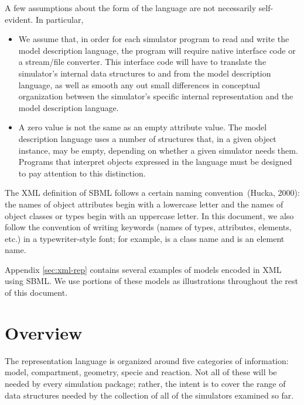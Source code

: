 \documentclass[10pt]{cek-article}
\begin{document}
A few assumptions about the form of the language are not
necessarily self-evident.  In particular,
\begin{itemize}

\item We assume that, in order for each simulator program to read and write
  the model description language, the program will require native interface
  code or a stream/file converter.  This interface code will have to
  translate the simulator's internal data structures to and from the model
  description language, as well as smooth any out small differences in
  conceptual organization between the simulator's specific internal
  representation and the model description language.

\item A zero value is not the same as an empty attribute value.  The model
  description language uses a number of structures that, in a given object
  instance, may be empty, depending on whether a given simulator needs
  them.  Programs that interpret objects expressed in the language must be
  designed to pay attention to this distinction.

\end{itemize}

The XML definition of SBML follows a certain naming convention~(Hucka,
2000): the names of object attributes begin with a lowercase letter and the
names of object classes or types begin with an uppercase letter.  In this
document, we also follow the convention of writing keywords (names of
types, attributes, elements, etc.) in a typewriter-style font; for example,
 is a class name and  is an element
name.

Appendix \ref{sec:xml-rep} contains several examples of models encoded in
XML using SBML.  We use portions of these models as illustrations
throughout the rest of this document.


\section{Overview}
\label{sec:overview}

The representation language is organized around five categories of
information: model, compartment, geometry, specie and reaction.  Not all of
these will be needed by every simulation package; rather, the intent is to
cover the range of data structures needed by the collection of all of the
simulators examined so far.
\end{document}
